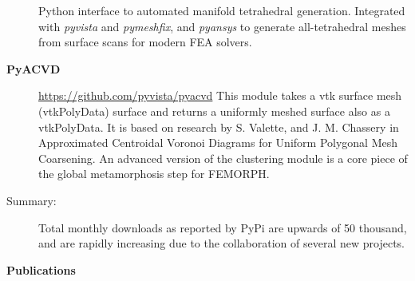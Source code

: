 \documentclass[letterpaper,11pt]{article}
\newcommand{\resheading}[1]{{\large \colorbox{mygrey}{\begin{minipage}{\textwidth}{\textbf{#1 \vphantom{p\^{E}}}}\end{minipage}}}}
\begin{document}
\begin{description}
Python interface to automated manifold tetrahedral generation.  Integrated with \textit{pyvista} and \textit{pymeshfix}, and \textit{pyansys} to generate all-tetrahedral meshes from surface scans for modern FEA solvers.
\item[\textbf{PyACVD}] \url{https://github.com/pyvista/pyacvd} \newline
  This module takes a vtk surface mesh (vtkPolyData) surface and returns a uniformly meshed surface also as a vtkPolyData.  It is based on research by S. Valette, and J. M. Chassery in Approximated Centroidal Voronoi Diagrams for Uniform Polygonal Mesh Coarsening.  An advanced version of the clustering module is a core piece of the global metamorphosis step for FEMORPH.

\item[Summary:] \newline
  Total monthly downloads as reported by PyPi are upwards of 50 thousand, and are rapidly increasing due to the collaboration of several new projects.
\end{description}


\resheading{Publications}
\end{document}
